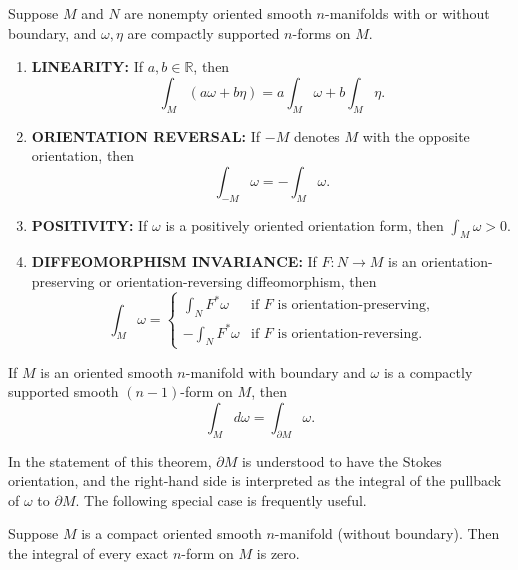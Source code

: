 \begin{proposition}
\label{prop:properties-integrals-forms}
Suppose $M$ and $N$ are nonempty oriented smooth $n$-manifolds with or without boundary, and $\omega, \eta$ are compactly supported $n$-forms on $M$.
\begin{enumerate}
\item[(a)] \textbf{LINEARITY:} If $a, b \in \mathbb{R}$, then
\[
\int_M (a\omega + b\eta) = a \int_M \omega + b \int_M \eta.
\]
\item[(b)] \textbf{ORIENTATION REVERSAL:} If $-M$ denotes $M$ with the opposite orientation, then
\[
\int_{-M} \omega = -\int_M \omega.
\]
\item[(c)] \textbf{POSITIVITY:} If $\omega$ is a positively oriented orientation form, then $\int_M \omega > 0$.
\item[(d)] \textbf{DIFFEOMORPHISM INVARIANCE:} If $F: N \to M$ is an orientation-preserving or orientation-reversing diffeomorphism, then
\[
\int_M \omega = \begin{cases}
\int_N F^*\omega & \text{if } F \text{ is orientation-preserving,} \\
-\int_N F^*\omega & \text{if } F \text{ is orientation-reversing.}
\end{cases}
\]
\end{enumerate}
\end{proposition}

\begin{theorem}
\label{thm:stokes-theorem}
If $M$ is an oriented smooth $n$-manifold with boundary and $\omega$ is a compactly supported smooth $(n-1)$-form on $M$, then
\begin{equation}
\int_M d\omega = \int_{\partial M} \omega. \tag{B.13}
\end{equation}
\end{theorem}

In the statement of this theorem, $\partial M$ is understood to have the Stokes orientation, and the right-hand side is interpreted as the integral of the pullback of $\omega$ to $\partial M$. The following special case is frequently useful.

\begin{corollary}
\label{cor:exact-integral-zero}
Suppose $M$ is a compact oriented smooth $n$-manifold (without boundary). Then the integral of every exact $n$-form on $M$ is zero.
\end{corollary}

